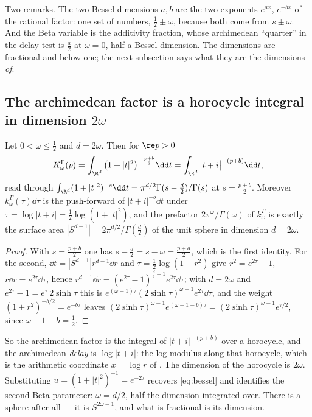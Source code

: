 Two remarks. The two Bessel dimensions $a,b$ are the two exponents $e^{ax}$,
$e^{-bx}$ of the rational factor: one set of numbers, $\frac12\pm\omega$,
because both come from $s\pm\omega$. And the Beta variable is the additivity
fraction, whose archimedean ``quarter'' in the delay test
\cite[Section~11]{WilsonLines} is $\frac a2$ at $\omega=0$, half a Bessel
dimension. The dimensions are fractional and below one; the next subsection says
what they are the dimensions \emph{of}.

\subsection{The archimedean factor is a horocycle integral in dimension \texorpdfstring{$2\omega$}{2 omega}}\label{sec:horocycle}

\begin{proposition}\label{prop:horocycle}
Let $0<\omega\leq\frac12$ and $d=2\omega$. Then for $\re p>0$
\begin{equation}\label{eq:horocycle}
 K^\Gamma_\omega(p)
 =\int_{\R^{d}}\big(1+|t|^2\big)^{-\frac{p+b}2}\dd t
 =\int_{\R^{d}}\big|t+i\big|^{-(p+b)}\dd t ,
\end{equation}
read through $\int_{\R^d}(1+|t|^2)^{-s}\dd t=\pi^{d/2}\Gamma(s-\frac d2)/\Gamma(s)$
at $s=\frac{p+b}2$. Moreover $k^\Gamma_\omega(\tau)\dd\tau$ is the push-forward
of $|t+i|^{-b}\dd t$ under $\tau=\log|t+i|=\frac12\log(1+|t|^2)$, and the
prefactor $2\pi^\omega/\Gamma(\omega)$ of $k^\Gamma_\omega$ is exactly the
surface area $|S^{d-1}|=2\pi^{d/2}/\Gamma(\frac d2)$ of the unit sphere in
dimension $d=2\omega$.
\end{proposition}
\begin{proof}
With $s=\frac{p+b}2$ one has $s-\frac d2=s-\omega=\frac{p+a}2$, which is the
first identity. For the second, $\dd t=|S^{d-1}|r^{d-1}\dd r$ and
$\tau=\frac12\log(1+r^2)$ give $r^2=e^{2\tau}-1$, $r\dd r=e^{2\tau}\dd\tau$,
hence $r^{d-1}\dd r=(e^{2\tau}-1)^{\frac d2-1}e^{2\tau}\dd\tau$; with $d=2\omega$
and $e^{2\tau}-1=e^\tau\,2\sinh\tau$ this is
$e^{(\omega-1)\tau}(2\sinh\tau)^{\omega-1}e^{2\tau}\dd\tau$, and the weight
$(1+r^2)^{-b/2}=e^{-b\tau}$ leaves
$(2\sinh\tau)^{\omega-1}e^{(\omega+1-b)\tau}=(2\sinh\tau)^{\omega-1}e^{\tau/2}$,
since $\omega+1-b=\frac12$.
\end{proof}

So the archimedean factor is the integral of $|t+i|^{-(p+b)}$ over a horocycle,
and the archimedean \emph{delay} is $\log|t+i|$: the log-modulus along that
horocycle, which is the arithmetic coordinate $x=\log r$ of
\cite[Section~10.4]{WilsonLines}. The dimension of the horocycle is $2\omega$.
Substituting $u=(1+|t|^2)^{-1}=e^{-2\tau}$ recovers \eqref{eq:bessel} and
identifies the second Beta parameter: $\omega=d/2$, half the dimension
integrated over. There is a sphere after all --- it is $S^{2\omega-1}$, and what
is fractional is its dimension.


